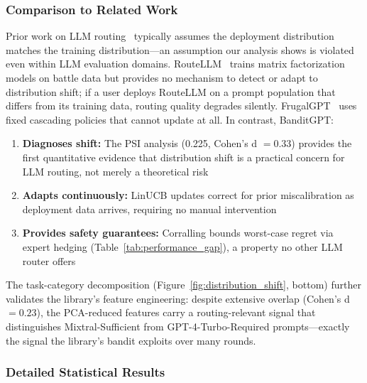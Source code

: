 \subsubsection{Comparison to Related Work}

Prior work on LLM routing~\cite{ong2024routellm,chen2024frugalgpt} typically assumes the deployment distribution matches the training distribution---an assumption our analysis shows is violated even within LLM evaluation domains. RouteLLM~\cite{ong2024routellm} trains matrix factorization models on battle data but provides no mechanism to detect or adapt to distribution shift; if a user deploys RouteLLM on a prompt population that differs from its training data, routing quality degrades silently. FrugalGPT~\cite{chen2024frugalgpt} uses fixed cascading policies that cannot update at all. In contrast, BanditGPT:

\begin{enumerate}[leftmargin=*,noitemsep,topsep=2pt]
    \item \textbf{Diagnoses shift:} The PSI analysis (0.225, Cohen's d $= 0.33$) provides the first quantitative evidence that distribution shift is a practical concern for LLM routing, not merely a theoretical risk
    \item \textbf{Adapts continuously:} LinUCB updates correct for prior miscalibration as deployment data arrives, requiring no manual intervention
    \item \textbf{Provides safety guarantees:} Corralling bounds worst-case regret via expert hedging (Table~\ref{tab:performance_gap}), a property no other LLM router offers
\end{enumerate}

\noindent The task-category decomposition (Figure~\ref{fig:distribution_shift}, bottom) further validates the library's feature engineering: despite extensive overlap (Cohen's d $= 0.23$), the PCA-reduced features carry a routing-relevant signal that distinguishes Mixtral-Sufficient from GPT-4-Turbo-Required prompts---exactly the signal the library's bandit exploits over many rounds.

\subsubsection{Detailed Statistical Results}

